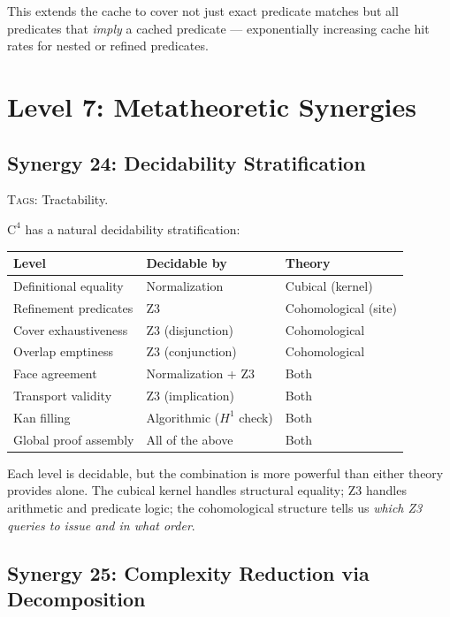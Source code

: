 \documentclass[11pt,a4paper]{article}
\theoremstyle{definition}
\theoremstyle{plain}
\newcommand{\Hone}{H^1}
\begin{document}
This extends the cache to cover not just exact predicate matches
but all predicates that \emph{imply} a cached predicate ---
exponentially increasing cache hit rates for nested or refined
predicates.


\section{Level 7: Metatheoretic Synergies}
\label{sec:syn-metatheory}


\subsection{Synergy 24: Decidability Stratification}
\label{sec:syn-decidability}

\textsc{Tags:} Tractability.

\medskip\noindent
$\mathrm{C}^4$ has a natural decidability stratification:

\begin{center}
\begin{tabular}{lll}
\toprule
\textbf{Level} & \textbf{Decidable by} & \textbf{Theory} \\
\midrule
Definitional equality & Normalization & Cubical (kernel) \\
Refinement predicates & Z3 & Cohomological (site) \\
Cover exhaustiveness & Z3 (disjunction) & Cohomological \\
Overlap emptiness & Z3 (conjunction) & Cohomological \\
Face agreement & Normalization + Z3 & Both \\
Transport validity & Z3 (implication) & Both \\
Kan filling & Algorithmic ($\Hone$ check) & Both \\
Global proof assembly & All of the above & Both \\
\bottomrule
\end{tabular}
\end{center}

Each level is decidable, but the combination is more powerful than
either theory provides alone.  The cubical kernel handles structural
equality; Z3 handles arithmetic and predicate logic; the cohomological
structure tells us \emph{which Z3 queries to issue and in what order}.


\subsection{Synergy 25: Complexity Reduction via Decomposition}
\label{sec:syn-complexity}
\end{document}

